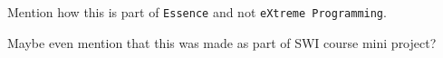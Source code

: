 Mention how this is part of \texttt{Essence} and not \texttt{eXtreme Programming}.

Maybe even mention that this was made as part of SWI course mini project?